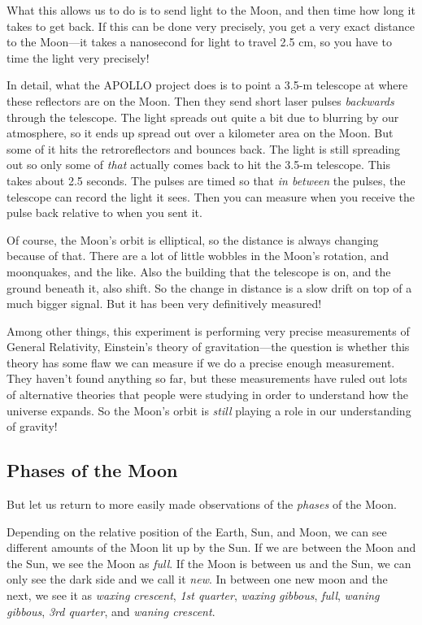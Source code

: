 \documentclass[12pt, preprint]{aastex}
\begin{document}
What this allows us to do is to send light to the Moon, and then time
how long it takes to get back. If this can be done very precisely, you
get a very exact distance to the Moon---it takes a nanosecond for
light to travel 2.5 cm, so you have to time the light very precisely!

In detail, what the APOLLO project does is to point a 3.5-m telescope
at where these reflectors are on the Moon. Then they send short laser
pulses {\it backwards} through the telescope. The light spreads out
quite a bit due to blurring by our atmosphere, so it ends up spread
out over a kilometer area on the Moon. But some of it hits the
retroreflectors and bounces back. The light is still spreading out so
only some of {\it that} actually comes back to hit the 3.5-m
telescope.  This takes about 2.5 seconds. The pulses are timed so that
{\it in between} the pulses, the telescope can record the light it
sees. Then you can measure when you receive the pulse back relative to
when you sent it.

Of course, the Moon's orbit is elliptical, so the distance is always
changing because of that.  There are a lot of little wobbles in the
Moon's rotation, and moonquakes, and the like.  Also the building that
the telescope is on, and the ground beneath it, also shift. So the
change in distance is a slow drift on top of a much bigger signal. But
it has been very definitively measured!

Among other things, this experiment is  performing very precise
measurements of General Relativity, Einstein's theory of
gravitation---the question is whether this theory has some flaw we can
measure if we do a precise enough measurement. They haven't found
anything so far, but these measurements have ruled out lots of
alternative theories that people were studying in order to understand
how the universe expands. So the Moon's orbit is {\it still} playing a
role in our understanding of gravity!

\subsection{Phases of the Moon}

But let us return to more easily made observations of the {\it phases}
of the Moon.

Depending on the relative position of the Earth, Sun, and Moon, we can
see different amounts of the Moon lit up by the Sun. If we are between
the Moon and the Sun, we see the Moon as {\it full}. If the Moon is
between us and the Sun, we can only see the dark side and we call it
{\it new}. In between one new moon and the next, we see it as {\it
  waxing crescent}, {\it 1st quarter}, {\it waxing gibbous}, {\it
  full}, {\it waning gibbous}, {\it 3rd quarter}, and {\it waning
  crescent}. 
\end{document}
